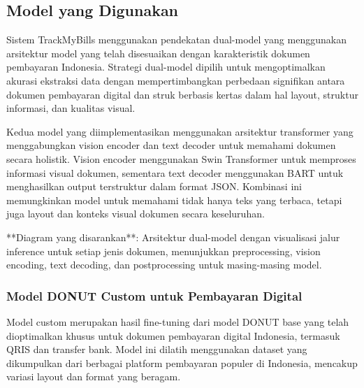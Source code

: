 \subsection{Model yang Digunakan}
\label{subsec:model-yang-digunakan}

Sistem TrackMyBills menggunakan pendekatan dual-model yang menggunakan arsitektur model \donut{} yang telah disesuaikan dengan karakteristik dokumen pembayaran Indonesia. Strategi dual-model dipilih untuk mengoptimalkan akurasi ekstraksi data dengan mempertimbangkan perbedaan signifikan antara dokumen pembayaran digital dan struk berbasis kertas dalam hal layout, struktur informasi, dan kualitas visual.

Kedua model yang diimplementasikan menggunakan arsitektur transformer yang menggabungkan vision encoder dan text decoder untuk memahami dokumen secara holistik. Vision encoder menggunakan Swin Transformer untuk memproses informasi visual dokumen, sementara text decoder menggunakan BART untuk menghasilkan output terstruktur dalam format JSON. Kombinasi ini memungkinkan model untuk memahami tidak hanya teks yang terbaca, tetapi juga layout dan konteks visual dokumen secara keseluruhan.

**Diagram yang disarankan**: Arsitektur dual-model dengan visualisasi jalur inference untuk setiap jenis dokumen, menunjukkan preprocessing, vision encoding, text decoding, dan postprocessing untuk masing-masing model.

\subsubsection{Model DONUT Custom untuk Pembayaran Digital}
\label{subsubsec:model-custom}

Model custom merupakan hasil fine-tuning dari model DONUT base yang telah dioptimalkan khusus untuk dokumen pembayaran digital Indonesia, termasuk QRIS dan transfer bank. Model ini dilatih menggunakan dataset yang dikumpulkan dari berbagai platform pembayaran populer di Indonesia, mencakup variasi layout dan format yang beragam.

